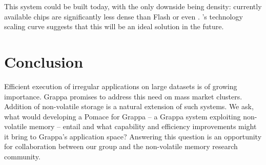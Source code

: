 
This system could be built today, with the only downside being
density: currently available  chips are significantly less dense
than Flash or even \@. 's technology scaling curve suggests that
this will be an ideal solution in the future.

\section{Conclusion}
Efficient execution of irregular applications on large datasets is of
growing importance.  Grappa promises to address this need on mass
market clusters.  Addition of non-volatile storage is a natural
extension of such systems.  We ask, what would developing a Pomace for
Grappa -- a Grappa system exploiting non-volatile memory -- entail and
what capability and efficiency improvements might it bring to Grappa's
application space?  Answering this question is an opportunity for
collaboration between our group and the non-volatile memory research community.


\begin{spacing}{0.8}


\end{spacing}






